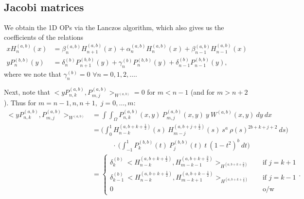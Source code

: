 \documentclass[11pt, oneside]{article}   	%
\newcommand{\half}{\frac{1}{2}}
\newcommand{\Pnkab}{P_{n,k}^{(a,b)}}
\newcommand{\Wab}{{W^{(a,b)}}}
\newcommand{\Pmjab}{P_{m,j}^{(a,b)}}
\begin{document}
\subsection{Jacobi matrices}

We obtain the 1D OPs via the Lanczos algorithm, which also gives us the coefficients of the relations
\begin{align}
x H_n^{(a,b)}(x) &= \beta_n^{(a,b)} H_{n+1}^{(a,b)}(x) + \alpha_n^{(a,b)} H_n^{(a,b)}(x) + \beta_{n-1}^{(a,b)} H_{n-1}^{(a,b)}(x) \\
y P_n^{(b,b)}(y) &= \delta_n^{(b)} P_{n+1}^{(b,b)}(y) + \gamma_n^{(b)} P_n^{(b,b)}(y) + \delta_{n-1}^{(b)} P_{n-1}^{(b,b)}(y),
\end{align}
where we note that \(\gamma_n^{(b)} = 0\) \(\forall n = 0,1,2,\dots\).

Next, note that \(<y \Pnkab, P_{m,j}^{(a,b)}>_\Wab = 0\) for \(m < n-1\) (and for \(m > n+2\)). Thus for \(m = n-1, n, n+1,\) \(j = 0,\dots,m:\)
\begin{align}
<y \Pnkab, P_{m,j}^{(a,b)}>_\Wab &= \int \int_\Omega \Pnkab(x,y) \: \Pmjab(x,y) \: y \: \Wab(x,y) \: dy \: dx \\
&= \Big( \int^1_0 H_{n-k}^{(a, b+k+\half)}(s) \: H_{m-j}^{(a, b+j+\half)}(s) \: s^a \: \rho(s)^{2b+k+j+2} \: ds \Big) \nonumber \\
& \quad \quad \quad\cdot \: \Big( \int^1_{-1} P_k^{(b,b)}(t) \: P_j^{(b,b)}(t) \: t \: (1-t^2)^b \: dt \Big) \\
&= \begin{cases}
    	\delta_k^{(b)} \: <H_{n-k}^{(a, b+k+\half)}, H_{m-k-1}^{(a, b+k+\frac{3}{2})}>_{H^{(a, b+k+\frac{3}{2})}} \quad& \text{if } j = k+1 \\
	\delta_{k-1}^{(b)} \: <H_{n-k}^{(a, b+k+\half)}, H_{m-k+1}^{(a, b+k-\half)}>_{H^{(a, b+k+\half)}} \quad& \text{if } j = k-1 \\
	0 & \text{o/w}
      \end{cases}.
\end{align}
\end{document}
